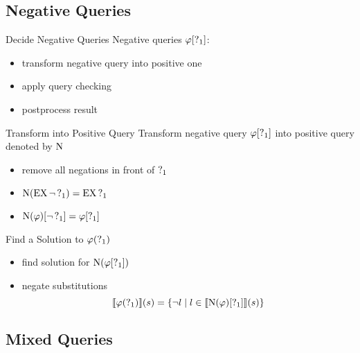 


\subsection{Negative Queries}%

\begin{frame}{Decide Negative Queries}
  Negative queries $\varphi[\operatorname{?}_1]$:
  \begin{itemize}
    \item transform negative query into positive one
    \item apply query checking
    \item postprocess result
  \end{itemize}
\end{frame}

\begin{frame}{Transform into Positive Query}
  Transform negative query $\varphi[\operatorname{?}_1]$ into positive query denoted by $\operatorname{N}$
  \begin{itemize}
    \item remove all negations in front of $\operatorname{?}_{1}$
    \item $\operatorname{N}(\operatorname{EX} \lnot \operatorname{?}_1) = \operatorname{EX} \operatorname{?}_{1}$
    \item $\operatorname{N}(\varphi)[\lnot\operatorname{?}_1] = \varphi[\operatorname{?}_1]$
  \end{itemize}
\end{frame}

\begin{frame}{Find a Solution to $\varphi(\operatorname{?}_1)$}
  \begin{itemize}
    \item find solution for $\operatorname{N}(\varphi[\operatorname{?}_1])$
    \item negate substitutions \\
      \[
        \llbracket \varphi(\operatorname{?}_1) \rrbracket (s) = \{ \lnot l \mid l \in 
          \llbracket \operatorname{N}(\varphi)[\operatorname{?}_1] \rrbracket (s) \}
      \]
  \end{itemize}
\end{frame}



\subsection{Mixed Queries}%

